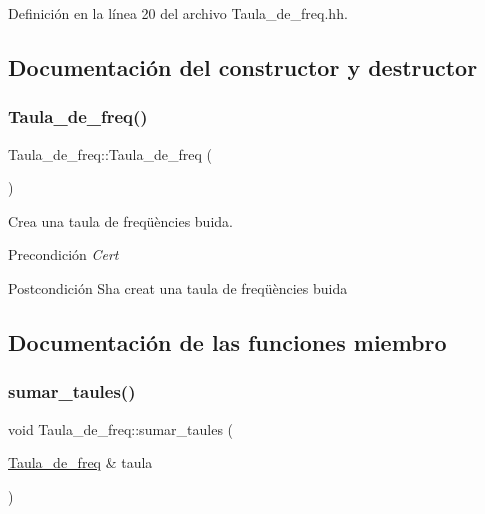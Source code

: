 Definición en la línea 20 del archivo Taula\+\_\+de\+\_\+freq.\+hh.



\subsection{Documentación del constructor y destructor}
\mbox{\label{class_taula__de__freq_a57b8d780af285f09746da0a96dfd9d61}} 
\subsubsection{\texorpdfstring{Taula\+\_\+de\+\_\+freq()}{Taula\_de\_freq()}}
{\footnotesize\ttfamily Taula\+\_\+de\+\_\+freq\+::\+Taula\+\_\+de\+\_\+freq (\begin{DoxyParamCaption}{ }\end{DoxyParamCaption})}



Crea una taula de freqüències buida. 

\begin{DoxyPrecond}{Precondición}
{\itshape Cert} 
\end{DoxyPrecond}
\begin{DoxyPostcond}{Postcondición}
S\textquotesingle{}ha creat una taula de freqüències buida 
\end{DoxyPostcond}


\subsection{Documentación de las funciones miembro}
\mbox{\label{class_taula__de__freq_a477d0c004880c24ecff3f477ba2d8e61}} 
\subsubsection{\texorpdfstring{sumar\+\_\+taules()}{sumar\_taules()}}
{\footnotesize\ttfamily void Taula\+\_\+de\+\_\+freq\+::sumar\+\_\+taules (\begin{DoxyParamCaption}\item[{\hyperlink{class_taula__de__freq}{Taula\+\_\+de\+\_\+freq} \&}]{taula }\end{DoxyParamCaption})}



